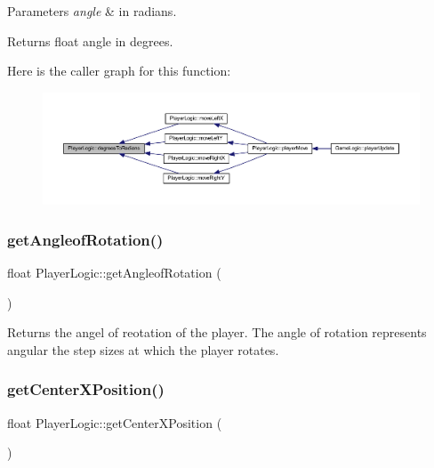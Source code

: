 \begin{DoxyParams}{Parameters}
{\em angle} & in radians. \\
\hline
\end{DoxyParams}
\begin{DoxyReturn}{Returns}
float angle in degrees. 
\end{DoxyReturn}
Here is the caller graph for this function\+:
\nopagebreak
\begin{figure}[H]
\begin{center}
\leavevmode
\includegraphics[width=350pt]{class_player_logic_a425e0b7a5a4495958a41383525f059eb_icgraph}
\end{center}
\end{figure}
\mbox{\label{class_player_logic_a692b3e5b8f5b052e28dbb0fdb7dc634c}} 
\subsubsection{\texorpdfstring{get\+Angleof\+Rotation()}{getAngleofRotation()}}
{\footnotesize\ttfamily float Player\+Logic\+::get\+Angleof\+Rotation (\begin{DoxyParamCaption}{ }\end{DoxyParamCaption})}



Returns the angel of reotation of the player. The angle of rotation represents angular the step sizes at which the player rotates. 

\mbox{\label{class_player_logic_a6bdec8d007701c16a3cbb87e7fdfe0e6}} 
\subsubsection{\texorpdfstring{get\+Center\+X\+Position()}{getCenterXPosition()}}
{\footnotesize\ttfamily float Player\+Logic\+::get\+Center\+X\+Position (\begin{DoxyParamCaption}{ }\end{DoxyParamCaption})\hspace{0.3cm}{\ttfamily [virtual]}}



